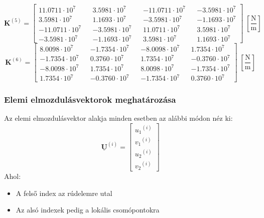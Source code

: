\documentclass[12pt,a4paper]{article}
\def\mx#1{\mathbf{#1}}
\def\vec#1{\underline{\mathrm{#1}}}
\def\i{\left(i\right)}
\def\Nm{\; \left[\mathrm{\frac{N}{m}}\right]}
\def\futyi{\cdot 10^{7}}
\begin{document}
\begin{equation}
    \mx{K}^{\left(5\right)}=
    \begin{bmatrix}
        11.0711 \futyi  &  & 3.5981 \futyi  &  & -11.0711 \futyi &  & -3.5981 \futyi \\
        3.5981 \futyi   &  & 1.1693 \futyi  &  & -3.5981 \futyi  &  & -1.1693 \futyi \\
        -11.0711 \futyi &  & -3.5981 \futyi &  & 11.0711 \futyi  &  & 3.5981 \futyi  \\
        -3.5981 \futyi  &  & -1.1693 \futyi &  & 3.5981 \futyi   &  & 1.1693 \futyi
    \end{bmatrix} \Nm
\end{equation}
\begin{equation}
    \mx{K}^{\left(6\right)}=
    \begin{bmatrix}
        8.0098 \futyi  &  & -1.7354 \futyi &  & -8.0098 \futyi &  & 1.7354 \futyi  \\
        -1.7354 \futyi &  & 0.3760 \futyi  &  & 1.7354 \futyi  &  & -0.3760 \futyi \\
        -8.0098 \futyi &  & 1.7354 \futyi  &  & 8.0098 \futyi  &  & -1.7354 \futyi \\
        1.7354 \futyi  &  & -0.3760 \futyi &  & -1.7354 \futyi &  & 0.3760 \futyi
    \end{bmatrix} \Nm
\end{equation}
\subsubsection{Elemi elmozdulásvektorok meghatározása}
Az elemi elmozdulásvektor alakja minden esetben az alábbi módon néz ki:
\begin{equation}
    \vec{\mathbf{U}}^{\i}=
    \begin{bmatrix}
        {u_1}^{\i} \\
        {v_1}^{\i} \\
        {u_2}^{\i} \\
        {v_2}^{\i}
    \end{bmatrix}
\end{equation}
Ahol:
\begin{itemize}
    \item A felső index az rúdelemre utal
    \item Az alsó indexek pedig a lokális csomópontokra
\end{itemize}
\end{document}
